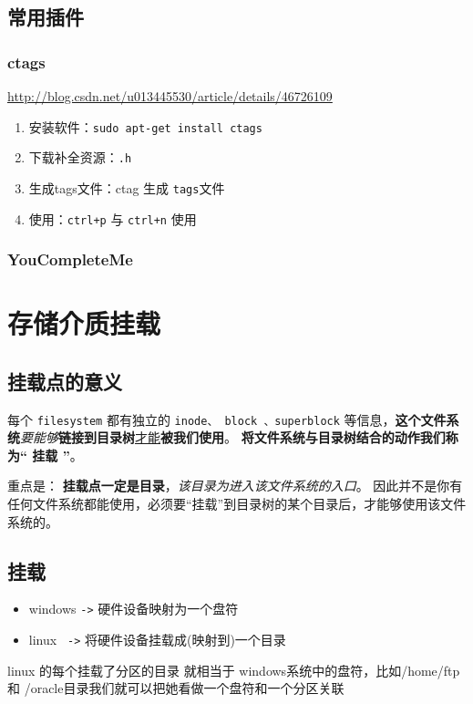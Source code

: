 \documentclass[UTF8,a4paper,12pt]{ctexbook}
\begin{document}
		\subsection{常用插件}
			\subsubsection{ctags}
				\url{http://blog.csdn.net/u013445530/article/details/46726109}
				\begin{enumerate}
					\item 安装软件：\verb|sudo apt-get install ctags|
					\item 下载补全资源：\verb|.h|
					\item 生成tags文件：ctag 生成 \verb|tags|文件
					\item 使用：\verb|ctrl+p| 与 \verb|ctrl+n| 使用
				\end{enumerate}
				
			\subsubsection{YouCompleteMe}
				
	\section{存储介质挂载}
		\subsection{挂载点的意义}
			每个 \verb|filesystem| 都有独立的 \verb|inode、 block 、superblock| 等信息，\textbf{这个文件系统}\textit{要能够}\textbf{链接到目录树}\underline{才能}\textbf{被我们使用}。 \textbf{将文件系统与目录树结合的动作我们称为“ 挂载 ”}。 
			
			重点是： \textbf{挂载点一定是目录}，\textit{该目录为进入该文件系统的入口}。 因此并不是你有任何文件系统都能使用，必须要“挂载”到目录树的某个目录后，才能够使用该文件系统的。
			
		\subsection{挂载}
			\begin{itemize}
				\item windows \verb|->| 硬件设备映射为一个盘符
				\item linux \verb| ->| 将硬件设备挂载成(映射到)一个目录
			\end{itemize}

			linux 的每个挂载了分区的目录 就相当于 windows系统中的盘符，比如/home/ftp 和 /oracle目录我们就可以把她看做一个盘符和一个分区关联
			
\end{document}
